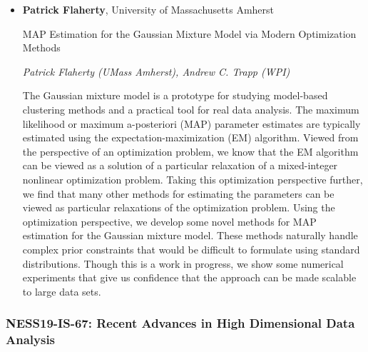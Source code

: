 \begin{itemize}
\item \textbf{Patrick Flaherty}, University of Massachusetts Amherst

MAP Estimation for the Gaussian Mixture Model via Modern Optimization Methods

\emph{\footnotesize Patrick Flaherty (UMass Amherst), Andrew C. Trapp (WPI)}

The Gaussian mixture model is a prototype for studying model-based clustering methods and a practical tool for real data analysis. The maximum likelihood or maximum a-posteriori (MAP) parameter estimates are typically estimated using the expectation-maximization (EM) algorithm. Viewed from the perspective of an optimization problem, we know that the EM algorithm can be viewed as a solution of a particular relaxation of a mixed-integer nonlinear optimization problem. Taking this optimization perspective further, we find that many other methods for estimating the parameters can be viewed as particular relaxations of the optimization problem. Using the optimization perspective, we develop some novel methods for MAP estimation for the Gaussian mixture model. These methods naturally handle complex prior constraints that would be difficult to formulate using standard distributions. Though this is a work in progress, we show some numerical experiments that give us confidence that the approach can be made scalable to large data sets.

\end{itemize}

\subsubsection*{NESS19-IS-67: Recent Advances in High Dimensional Data Analysis}

